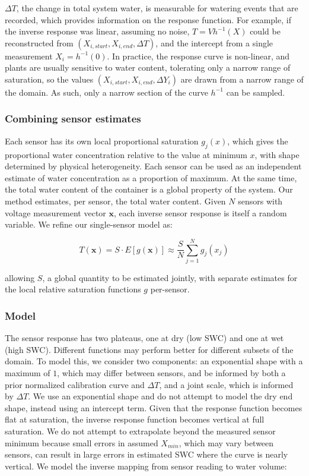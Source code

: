 \documentclass[11pt]{article}
\begin{document}
$\Delta T$, the change in total system water, is measurable for watering events that are recorded, which provides information on the response function. For example, if the inverse response was linear, assuming no noise, $T = Vh^{-1}(X)$ could be reconstructed from $(X_{i, start}, X_{i, end}, \Delta T)$, and the intercept from a single measurement $X_i = h^{-1}(0)$. In practice, the response curve is non-linear, and plants are usually sensitive to water content, tolerating only a narrow range of saturation, so the values $(X_{i,start}, X_{i,end}, \Delta Y_i)$ are drawn from a narrow range of the domain. As such, only a narrow section of the curve $h^{-1}$ can be sampled.

\subsubsection{Combining sensor estimates}

Each sensor has its own local proportional saturation $g_j(x)$, which gives the proportional water concentration relative to the value at minimum $x$, with shape determined by physical heterogeneity. Each sensor can be used as an independent estimate of water concentration as a proportion of maximum. At the same time, the total water content of the container is a global property of the system. Our method estimates, per sensor, the total water content. Given $N$ sensors with voltage measurement vector $\mathbf{x}$, each inverse sensor response is itself a random variable. We refine our single-sensor model as:

\begin{equation}
T(\mathbf{x}) = S \cdot E[g(\mathbf{x})] \approx \frac{S}{N}\sum_{j=1}^N g_j(x_j)
\end{equation}

allowing $S$, a global quantity to be estimated jointly, with separate estimates for the local relative saturation functions $g$ per-sensor.

\subsubsection{Model}

The sensor response has two plateaus, one at dry (low SWC) and one at wet (high SWC). Different functions may perform better for different subsets of the domain. To model this, we consider two components: an exponential shape with a maximum of $1$, which may differ between sensors, and be informed by both a prior normalized calibration curve and $\Delta T$, and a joint scale, which is informed by $\Delta T$. We use an exponential shape and do not attempt to model the dry end shape, instead using an intercept term. Given that the response function becomes flat at saturation, the inverse response function becomes vertical at full saturation. We do not attempt to extrapolate beyond the measured sensor minimum because small errors in assumed $X_{min}$, which may vary between sensors, can result in large errors in estimated SWC where the curve is nearly vertical. We model the inverse mapping from sensor reading to water volume:
\end{document}
